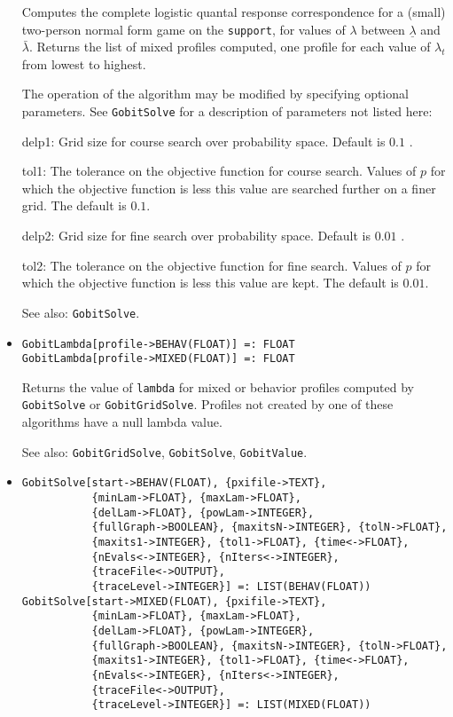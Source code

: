 \begin{itemize}
\bd
Computes the complete logistic quantal response correspondence for
a (small) two-person normal form game on the \verb+support+, for values of
$\lambda$ between $\underline{\lambda}$ and $\bar{\lambda}.$ Returns
the list of mixed profiles computed, one profile for each value of
$\lambda_t$ from lowest to highest.

The operation of the algorithm may be modified by specifying optional
parameters.  See \verb+GobitSolve+ for a description of parameters
not listed here:
\bd
\item
[delp1:] Grid size for course search over probability space.  Default
is $0.1$ .
\item
[tol1:] The tolerance on the objective function for course search.
Values of $p$ for which the objective function is less this value are
searched further on a finer grid.  The default is $0.1$.
\item
[delp2:] Grid size for fine search over probability space.  Default is
$0.01$ .
\item
[tol2:] The tolerance on the objective function for fine search.
Values of $p$ for which the objective function is less this value are
kept.  The default is $0.01$.  
\ed
\item [See also:] \verb+GobitSolve+.
\ed

\item{}
\protect \large \begin{verbatim}
GobitLambda[profile->BEHAV(FLOAT)] =: FLOAT
GobitLambda[profile->MIXED(FLOAT)] =: FLOAT
\end{verbatim}\normalsize

\bd
Returns the value of \verb+lambda+ for mixed or behavior profiles
computed by \verb+GobitSolve+ or \verb+GobitGridSolve+.  Profiles not
created by one of these algorithms have a null lambda value.
\item
[See also:] \verb+GobitGridSolve+, \verb+GobitSolve+, \verb+GobitValue+.
\ed

\item{}
\protect \large \begin{verbatim}
GobitSolve[start->BEHAV(FLOAT), {pxifile->TEXT},
           {minLam->FLOAT}, {maxLam->FLOAT},
           {delLam->FLOAT}, {powLam->INTEGER},
           {fullGraph->BOOLEAN}, {maxitsN->INTEGER}, {tolN->FLOAT},
           {maxits1->INTEGER}, {tol1->FLOAT}, {time<->FLOAT},
           {nEvals<->INTEGER}, {nIters<->INTEGER},
           {traceFile<->OUTPUT},
           {traceLevel->INTEGER}] =: LIST(BEHAV(FLOAT))
GobitSolve[start->MIXED(FLOAT), {pxifile->TEXT},
           {minLam->FLOAT}, {maxLam->FLOAT},
           {delLam->FLOAT}, {powLam->INTEGER},
           {fullGraph->BOOLEAN}, {maxitsN->INTEGER}, {tolN->FLOAT},
           {maxits1->INTEGER}, {tol1->FLOAT}, {time<->FLOAT},
           {nEvals<->INTEGER}, {nIters<->INTEGER},
           {traceFile<->OUTPUT},
           {traceLevel->INTEGER}] =: LIST(MIXED(FLOAT))
\end{verbatim}\normalsize


\end{itemize}
